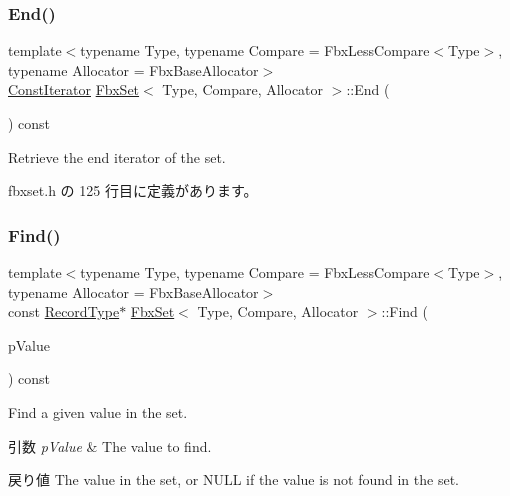 \subsubsection{\texorpdfstring{End()}{End()}\hspace{0.1cm}{\footnotesize\ttfamily [2/2]}}
{\footnotesize\ttfamily template$<$typename Type, typename Compare = Fbx\+Less\+Compare$<$\+Type$>$, typename Allocator = Fbx\+Base\+Allocator$>$ \\
\hyperlink{class_fbx_set_af9aee2f7b6a6638b816ea95bd510928c}{Const\+Iterator} \hyperlink{class_fbx_set}{Fbx\+Set}$<$ Type, Compare, Allocator $>$\+::End (\begin{DoxyParamCaption}{ }\end{DoxyParamCaption}) const\hspace{0.3cm}{\ttfamily [inline]}}



Retrieve the end iterator of the set. 



 fbxset.\+h の 125 行目に定義があります。

\mbox{\label{class_fbx_set_a49f1d5af6cdfb5a27af1624c7c2463ae}} 
\subsubsection{\texorpdfstring{Find()}{Find()}\hspace{0.1cm}{\footnotesize\ttfamily [1/2]}}
{\footnotesize\ttfamily template$<$typename Type, typename Compare = Fbx\+Less\+Compare$<$\+Type$>$, typename Allocator = Fbx\+Base\+Allocator$>$ \\
const \hyperlink{class_fbx_set_aa3934cd434a09288204f5e6c99b9cd01}{Record\+Type}$\ast$ \hyperlink{class_fbx_set}{Fbx\+Set}$<$ Type, Compare, Allocator $>$\+::Find (\begin{DoxyParamCaption}\item[{const \hyperlink{class_fbx_set_abb0f1b628634e07825532526e2e92baf}{Value\+Type} \&}]{p\+Value }\end{DoxyParamCaption}) const\hspace{0.3cm}{\ttfamily [inline]}}

Find a given value in the set. 
\begin{DoxyParams}{引数}
{\em p\+Value} & The value to find. \\
\hline
\end{DoxyParams}
\begin{DoxyReturn}{戻り値}
The value in the set, or N\+U\+LL if the value is not found in the set. 
\end{DoxyReturn}


